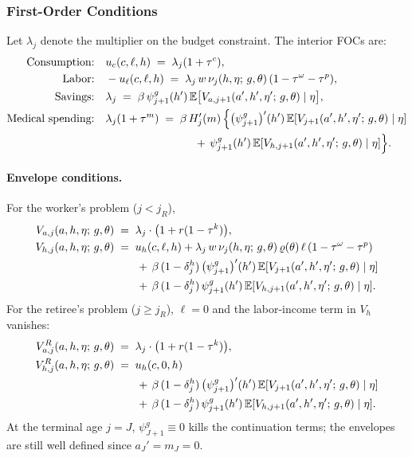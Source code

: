 \documentclass[12pt,a4paper]{article}
\newcommand{\E}{\mathbb{E}}
\begin{document}
\subsubsection{First-Order Conditions}
\label{subsubsec:focs}

Let $\lambda_j$ denote the multiplier on the budget constraint. The interior FOCs are:
\begin{align}
\text{Consumption:} \quad & u_c(c, \ell, h) \;=\; \lambda_j (1 + \tau^c), \label{eq:foc_c}\\
\text{Labor:} \quad & -u_\ell(c, \ell, h) \;=\; \lambda_j\, w\, \nu_j(h, \eta;\, g, \theta)\,(1-\tau^\omega-\tau^p), \label{eq:foc_l}\\
\text{Savings:} \quad & \lambda_j \;=\; \beta\, \psi_{j+1}^{g}(h')\, \E\bigl[V_{a, j+1}(a', h', \eta';\, g, \theta) \mid \eta\bigr], \label{eq:foc_a}\\
\text{Medical spending:} \quad & \lambda_j (1 + \tau^m)
\;=\; \beta\, H_j'(m)\,\Bigl\{
\bigl(\psi_{j+1}^{g}\bigr)'(h')\, \E[V_{j+1}(a', h', \eta';\, g, \theta) \mid \eta] \notag\\
&\qquad\qquad\qquad\qquad +\, \psi_{j+1}^{g}(h')\, \E[V_{h, j+1}(a', h', \eta';\, g, \theta) \mid \eta]
\Bigr\}. \label{eq:foc_m}
\end{align}

\paragraph{Envelope conditions.} For the worker's problem ($j < j_R$),
\begin{align}
V_{a, j}(a, h, \eta;\, g, \theta) &\;=\; \lambda_j \cdot \bigl(1 + r(1-\tau^k)\bigr), \label{eq:env_a}\\
V_{h, j}(a, h, \eta;\, g, \theta) &\;=\; u_h(c, \ell, h) + \lambda_j\, w\, \nu_j(h, \eta;\, g, \theta)\, \varrho(\theta)\, \ell\, (1-\tau^\omega-\tau^p) \notag\\
&\qquad +\, \beta\, (1-\delta_j^h)\, \bigl(\psi_{j+1}^{g}\bigr)'(h')\, \E[V_{j+1}(a', h', \eta';\, g, \theta) \mid \eta] \notag\\
&\qquad +\, \beta\, (1-\delta_j^h)\, \psi_{j+1}^{g}(h')\, \E[V_{h, j+1}(a', h', \eta';\, g, \theta) \mid \eta]. \label{eq:env_h}
\end{align}
For the retiree's problem ($j \geq j_R$), $\ell = 0$ and the labor-income term in $V_h$ vanishes:
\begin{align}
V_{a, j}^{R}(a, h, \eta;\, g, \theta) &\;=\; \lambda_j \cdot \bigl(1 + r(1-\tau^k)\bigr), \label{eq:env_a_ret}\\
V_{h, j}^{R}(a, h, \eta;\, g, \theta) &\;=\; u_h(c, 0, h) \notag\\
&\qquad +\, \beta\, (1-\delta_j^h)\, \bigl(\psi_{j+1}^{g}\bigr)'(h')\, \E[V_{j+1}(a', h', \eta';\, g, \theta) \mid \eta] \notag\\
&\qquad +\, \beta\, (1-\delta_j^h)\, \psi_{j+1}^{g}(h')\, \E[V_{h, j+1}(a', h', \eta';\, g, \theta) \mid \eta]. \label{eq:env_h_ret}
\end{align}
At the terminal age $j = J$, $\psi^{g}_{J+1} \equiv 0$ kills the continuation terms; the envelopes are still well defined since $a_J' = m_J = 0$.
\end{document}
